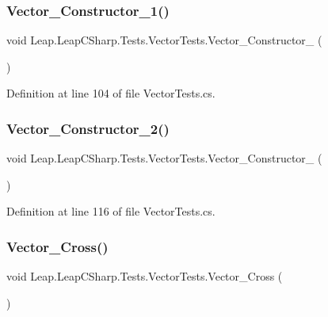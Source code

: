 \subsubsection{\texorpdfstring{Vector\_Constructor\_1()}{Vector\_Constructor\_1()}}
{\footnotesize\ttfamily void Leap.\+Leap\+C\+Sharp.\+Tests.\+Vector\+Tests.\+Vector\+\_\+\+Constructor\+\_ (\begin{DoxyParamCaption}{ }\end{DoxyParamCaption})}



Definition at line 104 of file Vector\+Tests.\+cs.

\mbox{\label{class_leap_1_1_leap_c_sharp_1_1_tests_1_1_vector_tests_aa0f506785e3ecc2850358f960168fed4}} 
\subsubsection{\texorpdfstring{Vector\_Constructor\_2()}{Vector\_Constructor\_2()}}
{\footnotesize\ttfamily void Leap.\+Leap\+C\+Sharp.\+Tests.\+Vector\+Tests.\+Vector\+\_\+\+Constructor\+\_ (\begin{DoxyParamCaption}{ }\end{DoxyParamCaption})}



Definition at line 116 of file Vector\+Tests.\+cs.

\mbox{\label{class_leap_1_1_leap_c_sharp_1_1_tests_1_1_vector_tests_a7ccc1b67410e1db3f7233d298713568d}} 
\subsubsection{\texorpdfstring{Vector\_Cross()}{Vector\_Cross()}}
{\footnotesize\ttfamily void Leap.\+Leap\+C\+Sharp.\+Tests.\+Vector\+Tests.\+Vector\+\_\+\+Cross (\begin{DoxyParamCaption}{ }\end{DoxyParamCaption})}



